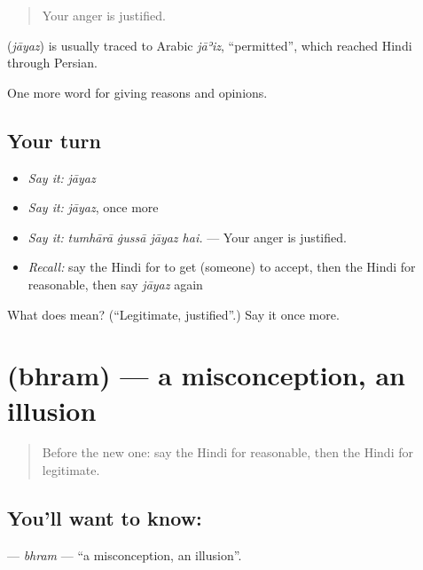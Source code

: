 \begin{quote}
Your anger is justified.
\end{quote}

\begin{cousinweb}
\textbf{} (\emph{jāyaz}) is usually traced to Arabic \emph{jāʾiz}, \textquotedblleft{}permitted\textquotedblright{}, which reached Hindi through Persian.
\end{cousinweb}

\begin{grammarlens}[title={What you've built}]
One more word for giving reasons and opinions.
\end{grammarlens}

\subsection*{Your turn}
\begin{itemize}
\raggedright
  \item \emph{Say it:} \emph{jāyaz}
  \item \emph{Say it:} \emph{jāyaz}, once more
  \item \emph{Say it:} \emph{tumhārā ġussā jāyaz hai.} — Your anger is justified.
  \item \emph{Recall:} say the Hindi for to get (someone) to accept, then the Hindi for reasonable, then say \emph{jāyaz} again
\end{itemize}

\begin{tcolorbox}[breakable,colback=teal!4,colframe=teal!35!black,title={Before you move on}]
What does  mean? (\textquotedblleft{}Legitimate, justified\textquotedblright{}.) Say it once more.
\end{tcolorbox}
\section[\texorpdfstring{\hi{भ्रम} (bhram)}{भ्रम (bhram)}]{ (bhram) — a misconception, an illusion}

\label{lesson:HI-C366-bhram}



\begin{quote}
Before the new one: say the Hindi for reasonable, then the Hindi for legitimate.
\end{quote}

\subsection*{You'll want to know: }
\textbf{} — \emph{bhram} — \textquotedblleft{}a misconception, an illusion\textquotedblright{}.

